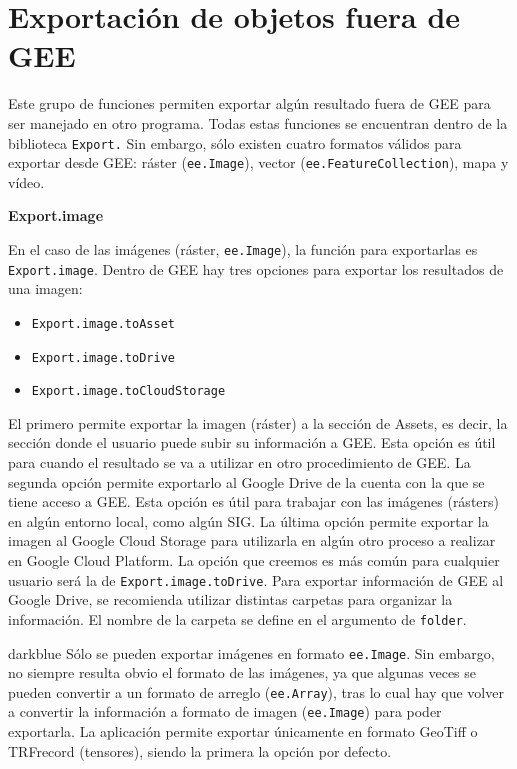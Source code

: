 \documentclass[
  12pt,
  letterpaper,
  twoside]{book}
\providecommand{\tightlist}{%
  \setlength{\itemsep}{0pt}\setlength{\parskip}{0pt}}
\begin{document}
\hypertarget{exportaciuxf3n-de-objetos-fuera-de-gee}{%
\section{Exportación de objetos fuera de GEE}\label{exportaciuxf3n-de-objetos-fuera-de-gee}}

Este grupo de funciones permiten exportar algún resultado fuera de GEE para ser manejado en otro programa. Todas estas funciones se encuentran dentro de la biblioteca \texttt{Export.} Sin embargo, sólo existen cuatro formatos válidos para exportar desde GEE: ráster (\texttt{ee.Image}), vector (\texttt{ee.FeatureCollection}), mapa y vídeo.

\textbf{Export.image}

En el caso de las imágenes (ráster, \texttt{ee.Image}), la función para exportarlas es \texttt{Export.image}. Dentro de GEE hay tres opciones para exportar los resultados de una imagen:

\begin{itemize}
\tightlist
\item
  \texttt{Export.image.toAsset}
\item
  \texttt{Export.image.toDrive}
\item
  \texttt{Export.image.toCloudStorage}
\end{itemize}

El primero permite exportar la imagen (ráster) a la sección de Assets, es decir, la sección donde el usuario puede subir su información a GEE. Esta opción es útil para cuando el resultado se va a utilizar en otro procedimiento de GEE. La segunda opción permite exportarlo al Google Drive de la cuenta con la que se tiene acceso a GEE. Esta opción es útil para trabajar con las imágenes (rásters) en algún entorno local, como algún SIG. La última opción permite exportar la imagen al Google Cloud Storage para utilizarla en algún otro proceso a realizar en Google Cloud Platform. La opción que creemos es más común para cualquier usuario será la de \texttt{Export.image.toDrive}. Para exportar información de GEE al Google Drive, se recomienda utilizar distintas carpetas para organizar la información. El nombre de la carpeta se define en el argumento de \texttt{folder}.

\begin{bluebox2}

\begin{awesomeblock}{5pt}{\faLightbulb}{darkblue}
Sólo se pueden exportar imágenes en formato \texttt{ee.Image}. Sin embargo, no siempre resulta obvio el formato de las imágenes, ya que algunas veces se pueden convertir a un formato de arreglo (\texttt{ee.Array}), tras lo cual hay que volver a convertir la información a formato de imagen (\texttt{ee.Image}) para poder exportarla. La aplicación permite exportar únicamente en formato GeoTiff o TRFrecord (tensores), siendo la primera la opción por defecto.

\end{awesomeblock}

\end{bluebox2}
\end{document}
